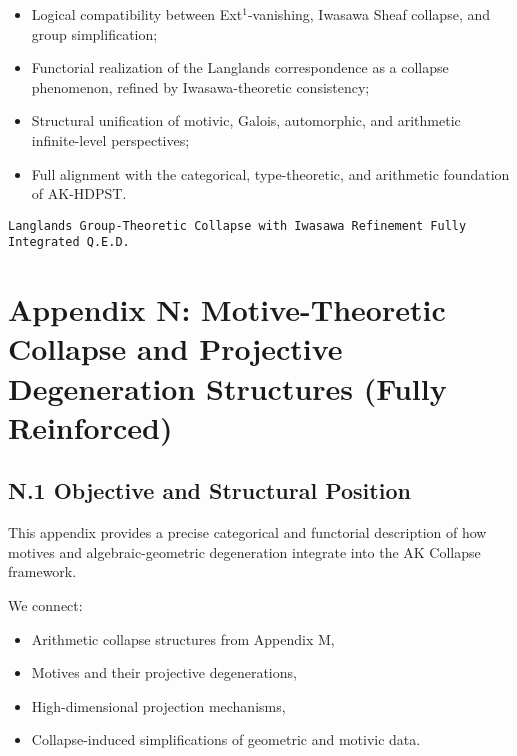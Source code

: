 \documentclass[11pt]{article}
\begin{document}
\begin{itemize}
    \item Logical compatibility between Ext$^1$-vanishing, Iwasawa Sheaf collapse, and group simplification;
    \item Functorial realization of the Langlands correspondence as a collapse phenomenon, refined by Iwasawa-theoretic consistency;
    \item Structural unification of motivic, Galois, automorphic, and arithmetic infinite-level perspectives;
    \item Full alignment with the categorical, type-theoretic, and arithmetic foundation of AK-HDPST.
\end{itemize}

\begin{flushright}
\texttt{Langlands Group-Theoretic Collapse with Iwasawa Refinement \quad Fully Integrated \quad Q.E.D.}
\end{flushright}





\section*{Appendix N: Motive-Theoretic Collapse and Projective Degeneration Structures (Fully Reinforced)}

\subsection*{N.1 Objective and Structural Position}

This appendix provides a precise categorical and functorial description of how motives and algebraic-geometric degeneration integrate into the AK Collapse framework.  

We connect:
\begin{itemize}
  \item Arithmetic collapse structures from Appendix M,
  \item Motives and their projective degenerations,
  \item High-dimensional projection mechanisms,
  \item Collapse-induced simplifications of geometric and motivic data.
\end{itemize}
\end{document}
